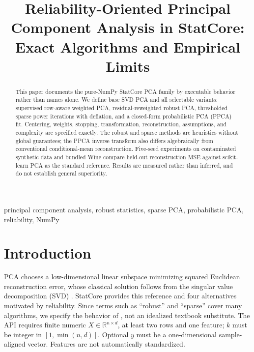 \documentclass[conference]{IEEEtran}
\title{Reliability-Oriented Principal Component Analysis in StatCore: Exact Algorithms and Empirical Limits}
\author{\jabulaniauthor
\and
\martinchanzauthor
\and
\oloratoauthor
\and
\mfundoauthor}
\begin{document}
\maketitle
\begin{abstract}
This paper documents the pure-NumPy StatCore PCA family by executable behavior rather than names alone. We define base SVD PCA and all selectable variants: supervised row-aware weighted PCA, residual-reweighted robust PCA, thresholded sparse power iterations with deflation, and a closed-form probabilistic PCA (PPCA) fit. Centering, weights, stopping, transformation, reconstruction, assumptions, and complexity are specified exactly. The robust and sparse methods are heuristics without global guarantees; the PPCA inverse transform also differs algebraically from conventional conditional-mean reconstruction. Five-seed experiments on contaminated synthetic data and bundled Wine compare held-out reconstruction MSE against scikit-learn PCA as the standard reference. Results are measured rather than inferred, and do not establish general superiority.
\end{abstract}
\begin{IEEEkeywords}
principal component analysis, robust statistics, sparse PCA, probabilistic PCA, reliability, NumPy
\end{IEEEkeywords}
\section{Introduction}
PCA chooses a low-dimensional linear subspace minimizing squared Euclidean reconstruction error, whose classical solution follows from the singular value decomposition (SVD) \cite{pearson1901,jolliffe2002}. StatCore provides this reference and four alternatives motivated by reliability. Since terms such as ``robust'' and ``sparse'' cover many algorithms, we specify the behavior of , not an idealized textbook substitute. The API requires finite numeric \(X\in\mathbb R^{n\times d}\), at least two rows and one feature; \(k\) must be integer in \([1,\min(n,d)]\). Optional \(y\) must be a one-dimensional sample-aligned vector. Features are not automatically standardized.
\end{document}
